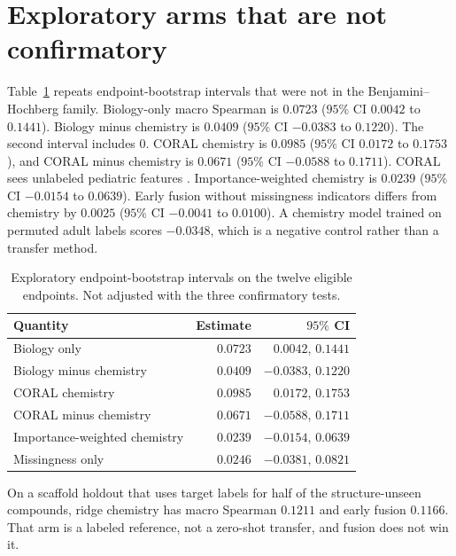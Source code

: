 \documentclass{article}
\begin{document}



\appendix

\section{Exploratory arms that are not confirmatory}
\label{app:explore}

Table~\ref{tab:explore} repeats endpoint-bootstrap intervals that were not in the Benjamini--Hochberg family.
Biology-only macro Spearman is $0.0723$ ($95\%$ CI $0.0042$ to $0.1441$).
Biology minus chemistry is $0.0409$ ($95\%$ CI $-0.0383$ to $0.1220$).
The second interval includes $0$.
CORAL chemistry is $0.0985$ ($95\%$ CI $0.0172$ to $0.1753$), and CORAL minus chemistry is $0.0671$ ($95\%$ CI $-0.0588$ to $0.1711$).
CORAL sees unlabeled pediatric features \citep{sun2016coral}.
Importance-weighted chemistry is $0.0239$ ($95\%$ CI $-0.0154$ to $0.0639$).
Early fusion without missingness indicators differs from chemistry by $0.0025$ ($95\%$ CI $-0.0041$ to $0.0100$).
A chemistry model trained on permuted adult labels scores $-0.0348$, which is a negative control rather than a transfer method.

\begin{table}[h]
\caption{Exploratory endpoint-bootstrap intervals on the twelve eligible endpoints. Not adjusted with the three confirmatory tests.}
\label{tab:explore}
\centering
\small
\begin{tabular}{lrr}
\toprule
Quantity & Estimate & $95\%$ CI \\
\midrule
Biology only & $0.0723$ & $0.0042$, $0.1441$ \\
Biology minus chemistry & $0.0409$ & $-0.0383$, $0.1220$ \\
CORAL chemistry & $0.0985$ & $0.0172$, $0.1753$ \\
CORAL minus chemistry & $0.0671$ & $-0.0588$, $0.1711$ \\
Importance-weighted chemistry & $0.0239$ & $-0.0154$, $0.0639$ \\
Missingness only & $0.0246$ & $-0.0381$, $0.0821$ \\
\bottomrule
\end{tabular}
\end{table}

On a scaffold holdout that uses target labels for half of the structure-unseen compounds, ridge chemistry has macro Spearman $0.1211$ and early fusion $0.1166$.
That arm is a labeled reference, not a zero-shot transfer, and fusion does not win it.
\end{document}
